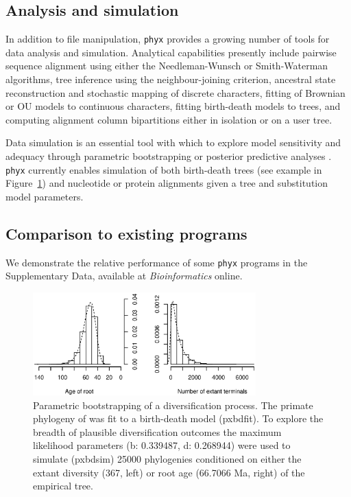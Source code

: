 \documentclass{bioinfo}
\begin{document}
\begin{methods}
\subsection{Analysis and simulation}

In addition to file manipulation, \texttt{phyx} provides a growing
number of tools for data analysis and simulation. Analytical capabilities
presently include pairwise sequence alignment using either the
Needleman-Wunsch or Smith-Waterman algorithms,
tree inference using the neighbour-joining criterion,
ancestral state reconstruction and stochastic mapping of discrete characters,
fitting of Brownian or OU models to continuous
characters, fitting birth-death models to trees, and
computing alignment column bipartitions either in isolation or on a user
tree.

Data simulation is an essential tool with which to explore model
sensitivity and adequacy through parametric bootstrapping or posterior
predictive analyses \citep{Bollback2002}. \texttt{phyx} currently enables
simulation of both
birth-death trees (see example in Figure~\ref{fig:01}) and nucleotide or
protein alignments given a tree and substitution model parameters.

\subsection{Comparison to existing programs}


We demonstrate the relative performance of some \texttt{phyx} programs in
the Supplementary Data, available at \textit{Bioinformatics} online.

\end{methods}

\begin{figure}[!tpb]%
\centerline{\includegraphics[width=86mm]{Fig1_smallblack.eps}}
\caption{Parametric bootstrapping of a diversification process. The primate phylogeny of \cite{Springer2012} was fit to a birth-death model (pxbdfit). To explore the breadth of plausible diversification outcomes the maximum likelihood parameters (b: 0.339487, d: 0.268944) were used to simulate (pxbdsim) 25000 phylogenies conditioned on either the extant diversity (367, left) or root age (66.7066 Ma, right) of the empirical tree.}\label{fig:01}
\end{figure}
\end{document}
